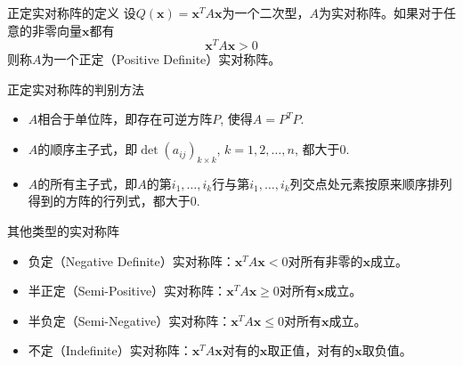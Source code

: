 \documentclass[10pt]{beamer}
\begin{document}

\begin{frame}

\begin{block}{正定实对称阵的定义}
设$Q(\mathbf{x}) = \mathbf{x}^T A \mathbf{x}$为一个二次型，$A$为实对称阵。如果对于任意的非零向量$\mathbf{x}$都有
$$\mathbf{x}^T A \mathbf{x} > 0$$
则称$A$为一个正定（Positive Definite）实对称阵。
\end{block}

\vspace{1em}
\pause

\begin{block}{正定实对称阵的判别方法}
\begin{itemize}
\item $A$相合于单位阵，即存在可逆方阵$P$, 使得$A = P^TP$.
\item $A$的顺序主子式，即$\det (a_{ij})_{k\times k}$, $k = 1,2,\ldots,n$, 都大于0.
\item $A$的所有主子式，即$A$的第$i_1,\ldots,i_k$行与第$i_1,\ldots,i_k$列交点处元素按原来顺序排列得到的方阵的行列式，都大于0.
\end{itemize}
\end{block}

\end{frame}


\begin{frame}

\begin{block}{其他类型的实对称阵}
\begin{itemize}
\item 负定（Negative Definite）实对称阵：$\mathbf{x}^T A \mathbf{x} < 0$对所有非零的$\mathbf{x}$成立。\newline
\item 半正定（Semi-Positive）实对称阵：$\mathbf{x}^T A \mathbf{x} \geqslant 0$对所有$\mathbf{x}$成立。\newline
\item 半负定（Semi-Negative）实对称阵：$\mathbf{x}^T A \mathbf{x} \leqslant 0$对所有$\mathbf{x}$成立。\newline
\item 不定（Indefinite）实对称阵：$\mathbf{x}^T A \mathbf{x}$对有的$\mathbf{x}$取正值，对有的$\mathbf{x}$取负值。
\end{itemize}
\end{block}

\end{frame}
\end{document}
